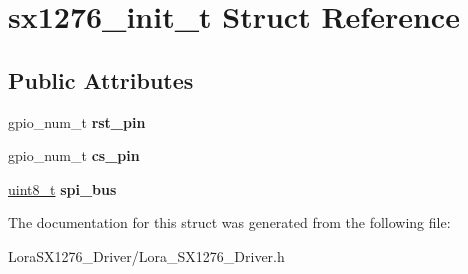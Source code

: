 \hypertarget{structsx1276__init__t}{}\section{sx1276\+\_\+init\+\_\+t Struct Reference}
\label{structsx1276__init__t}
\subsection*{Public Attributes}
\begin{DoxyCompactItemize}
\item 
\mbox{\label{structsx1276__init__t_ab91fb4027f3653e7c4a360b11b6424aa}} 
gpio\+\_\+num\+\_\+t {\bfseries rst\+\_\+pin}
\item 
\mbox{\label{structsx1276__init__t_aed8d5e6f915e33bd2abc106fcb2b05e7}} 
gpio\+\_\+num\+\_\+t {\bfseries cs\+\_\+pin}
\item 
\mbox{\label{structsx1276__init__t_a4b5c8ebd9f46115d62ac9ec2789518ab}} 
\hyperlink{vl53l0x__types_8h_aba7bc1797add20fe3efdf37ced1182c5}{uint8\+\_\+t} {\bfseries spi\+\_\+bus}
\end{DoxyCompactItemize}


The documentation for this struct was generated from the following file\+:\begin{DoxyCompactItemize}
\item 
Lora\+S\+X1276\+\_\+\+Driver/Lora\+\_\+\+S\+X1276\+\_\+\+Driver.\+h\end{DoxyCompactItemize}
